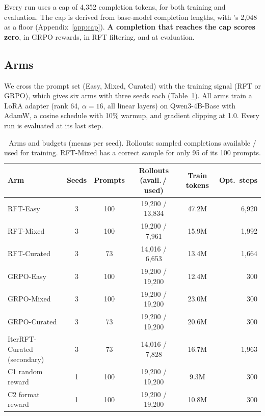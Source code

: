 \documentclass{article}
\begin{document}
Every run uses a cap of 4{,}352 completion tokens, for both training and evaluation. The cap is derived from base-model completion lengths, with \citeauthor{bauer2026}'s 2{,}048 as a floor (Appendix~\ref{app:cap}). \textbf{A completion that reaches the cap scores zero}, in GRPO rewards, in RFT filtering, and at evaluation.

\FloatBarrier
\subsection{Arms}
\label{sec:arms}

We cross the prompt set (Easy, Mixed, Curated) with the training signal (RFT or GRPO), which gives six arms with three seeds each (Table~\ref{tab:arms}). All arms train a LoRA adapter (rank 64, $\alpha{=}16$, all linear layers) on Qwen3-4B-Base with AdamW, a cosine schedule with 10\% warmup, and gradient clipping at 1.0. Every run is evaluated at its last step.

\begin{table}[t]
\centering\small
\caption{Arms and budgets (means per seed). Rollouts: sampled completions available / used for training. RFT-Mixed has a correct sample for only 95 of its 100 prompts.}
\label{tab:arms}
\begin{tabular}{lccccr}
\toprule
Arm & Seeds & Prompts & Rollouts (avail.\,/\,used) & Train tokens & Opt.\ steps \\
\midrule
RFT-Easy      & 3 & 100 & 19{,}200 / 13{,}834 & 47.2M & 6{,}920 \\
RFT-Mixed     & 3 & 100 & 19{,}200 / 7{,}961  & 15.9M & 1{,}992 \\
RFT-Curated   & 3 & 73  & 14{,}016 / 6{,}653  & 13.4M & 1{,}664 \\
GRPO-Easy     & 3 & 100 & 19{,}200 / 19{,}200 & 12.4M & 300 \\
GRPO-Mixed    & 3 & 100 & 19{,}200 / 19{,}200 & 23.0M & 300 \\
GRPO-Curated  & 3 & 73  & 19{,}200 / 19{,}200 & 20.6M & 300 \\
\midrule
IterRFT-Curated (secondary) & 3 & 73 & 14{,}016 / 7{,}828 & 16.7M & 1{,}963 \\
C1 random reward  & 1 & 100 & 19{,}200 / 19{,}200 & 9.3M  & 300 \\
C2 format reward  & 1 & 100 & 19{,}200 / 19{,}200 & 10.8M & 300 \\
\bottomrule
\end{tabular}
\end{table}
\end{document}
